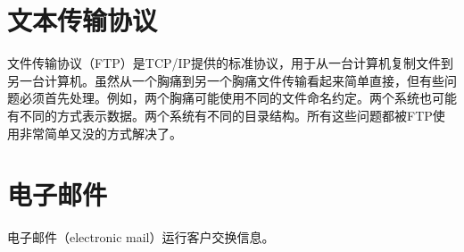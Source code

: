 \section{文本传输协议}
文件传输协议（FTP）是TCP/IP提供的标准协议，用于从一台计算机复制文件到另一台计算机。虽然从一个胸痛到另一个胸痛文件传输看起来简单直接，但有些问题必须首先处理。例如，两个胸痛可能使用不同的文件命名约定。两个系统也可能有不同的方式表示数据。两个系统有不同的目录结构。所有这些问题都被FTP使用非常简单又没的方式解决了。
\section{电子邮件}
电子邮件（electronic mail）运行客户交换信息。

